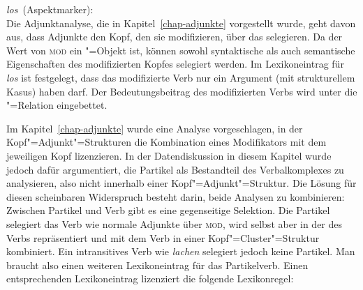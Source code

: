 \eas
\label{le-los-asp}
\mbox{\emph{los} (Aspektmarker):}\\
\zs{}
Die Adjunktanalyse, die in Kapitel~\ref{chap-adjunkte} vorgestellt wurde,
geht davon aus, dass Adjunkte den Kopf, den sie modifizieren, über das \modm selegieren.
Da der Wert von \textsc{mod} ein "=Objekt ist, können sowohl syntaktische als auch semantische
Eigenschaften des modifizierten Kopfes selegiert werden. Im Lexikoneintrag für \emph{los}
ist festgelegt, dass das modifizierte Verb nur ein Argument (mit strukturellem Kasus)
haben darf. Der Bedeutungsbeitrag des modifizierten Verbs wird unter die "=Relation
eingebettet.

Im Kapitel~\ref{chap-adjunkte} wurde eine Analyse vorgeschlagen,
in der Kopf"=Adjunkt"=Strukturen die Kombination eines Modifikators mit dem jeweiligen Kopf lizenzieren.
In der Datendiskussion in diesem Kapitel wurde jedoch dafür argumentiert,
die Partikel als Bestandteil des Verbalkomplexes zu analysieren, also nicht innerhalb einer
Kopf"=Adjunkt"=Struktur. Die Lösung für diesen scheinbaren Widerspruch besteht darin, beide Analysen zu kombinieren: Zwischen Partikel
und Verb gibt es eine gegenseitige Selektion. Die Partikel selegiert das Verb wie normale
Adjunkte über \textsc{mod}, wird selbst aber in der \compsl des Verbs repräsentiert und mit dem
Verb in einer Kopf"=Cluster"=Struktur kombiniert. Ein intransitives Verb wie \emph{lachen} selegiert
jedoch keine Partikel. Man braucht also einen weiteren Lexikoneintrag für das Partikelverb.
Einen entsprechenden Lexikoneintrag lizenziert die folgende Lexikonregel:


